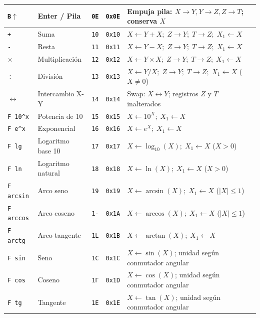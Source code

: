 \documentclass[11pt,a4paper]{article}
\begin{document}
{\begin{longtable}{p{2.2cm}p{3.0cm}>{\centering\arraybackslash}p{1.0cm}>{\centering\arraybackslash}p{1.2cm}p{7.3cm}}
\texttt{В$\uparrow$} & Enter / Pila & \texttt{0E} & \texttt{0x0E} & Empuja pila: $X \to Y, Y \to Z, Z \to T$; conserva $X$ \\
\midrule
\texttt{+} & Suma & \texttt{10} & \texttt{0x10} & $X \leftarrow Y + X;\; Z \to Y;\; T \to Z;\; X_1 \leftarrow X$ \\
\texttt{-} & Resta & \texttt{11} & \texttt{0x11} & $X \leftarrow Y - X;\; Z \to Y;\; T \to Z;\; X_1 \leftarrow X$ \\
\texttt{$\times$} & Multiplicación & \texttt{12} & \texttt{0x12} & $X \leftarrow Y \times X;\; Z \to Y;\; T \to Z;\; X_1 \leftarrow X$ \\
\texttt{$\div$} & División & \texttt{13} & \texttt{0x13} & $X \leftarrow Y / X;\; Z \to Y;\; T \to Z;\; X_1 \leftarrow X$ ($X \ne 0$) \\
\texttt{$\leftrightarrow$} & Intercambio X-Y & \texttt{14} & \texttt{0x14} & Swap: $X \leftrightarrow Y$; registros $Z$ y $T$ inalterados \\
\texttt{F 10\textasciicircum x} & Potencia de 10 & \texttt{15} & \texttt{0x15} & $X \leftarrow 10^X;\; X_1 \leftarrow X$ \\
\texttt{F e\textasciicircum x} & Exponencial & \texttt{16} & \texttt{0x16} & $X \leftarrow e^X;\; X_1 \leftarrow X$ \\
\texttt{F lg} & Logaritmo base 10 & \texttt{17} & \texttt{0x17} & $X \leftarrow \log_{10}(X);\; X_1 \leftarrow X$ ($X > 0$) \\
\texttt{F ln} & Logaritmo natural & \texttt{18} & \texttt{0x18} & $X \leftarrow \ln(X);\; X_1 \leftarrow X$ ($X > 0$) \\
\texttt{F arcsin} & Arco seno & \texttt{19} & \texttt{0x19} & $X \leftarrow \arcsin(X);\; X_1 \leftarrow X$ ($|X| \le 1$) \\
\texttt{F arccos} & Arco coseno & \texttt{1-} & \texttt{0x1A} & $X \leftarrow \arccos(X);\; X_1 \leftarrow X$ ($|X| \le 1$) \\
\texttt{F arctg} & Arco tangente & \texttt{1L} & \texttt{0x1B} & $X \leftarrow \arctan(X);\; X_1 \leftarrow X$ \\
\texttt{F sin} & Seno & \texttt{1C} & \texttt{0x1C} & $X \leftarrow \sin(X)$; unidad según conmutador angular \\
\texttt{F cos} & Coseno & \texttt{1Г} & \texttt{0x1D} & $X \leftarrow \cos(X)$; unidad según conmutador angular \\
\texttt{F tg} & Tangente & \texttt{1E} & \texttt{0x1E} & $X \leftarrow \tan(X)$; unidad según conmutador angular \\

\end{longtable}}
\end{document}
